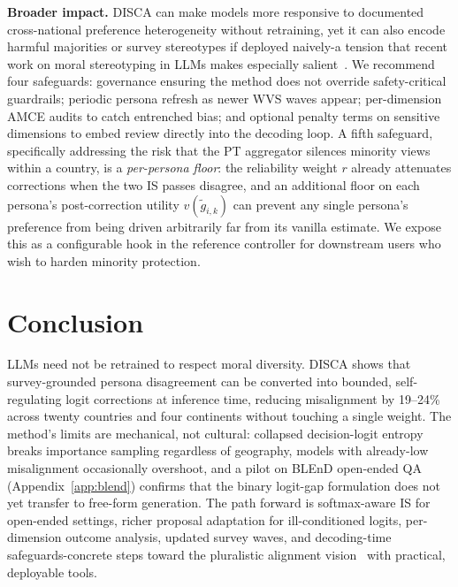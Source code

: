 \documentclass{article}
\begin{document}
\textbf{Broader impact.}
DISCA can make models more responsive to documented cross-national
preference heterogeneity without retraining, yet it can also encode
harmful majorities or survey stereotypes if deployed naively-a tension
that recent work on moral stereotyping in LLMs makes especially
salient~\citep{zewail2025moral}. We recommend four safeguards:
governance ensuring the method does not override safety-critical
guardrails; periodic persona refresh as newer WVS waves appear;
per-dimension AMCE audits to catch entrenched bias; and optional penalty
terms on sensitive dimensions to embed review directly into the decoding
loop. A fifth safeguard, specifically addressing the risk that the PT
aggregator silences minority views within a country, is a
\emph{per-persona floor}: the reliability weight $r$ already attenuates
corrections when the two IS passes disagree, and an additional floor on
each persona's post-correction utility $v(\tilde g_{i,k})$ can prevent
any single persona's preference from being driven arbitrarily far from
its vanilla estimate. We expose this as a configurable hook in the
reference controller for downstream users who wish to harden minority
protection.

\section{Conclusion}
\label{sec:conclusion}

LLMs need not be retrained to respect moral diversity. DISCA shows that survey-grounded persona disagreement can be converted into bounded, self-regulating logit corrections at inference time, reducing misalignment by 19--24\% across twenty countries and four continents without touching a single weight. The method's limits are mechanical, not cultural: collapsed decision-logit entropy breaks importance sampling regardless of geography, models with already-low misalignment occasionally overshoot, and a pilot on BLEnD open-ended QA (Appendix~\ref{app:blend}) confirms that the binary logit-gap formulation does not yet transfer to free-form generation. The path forward is softmax-aware IS for open-ended settings, richer proposal adaptation for ill-conditioned logits, per-dimension outcome analysis, updated survey waves, and decoding-time safeguards-concrete steps toward the pluralistic alignment vision~\citep{sorensen2024roadmap} with practical, deployable tools.
\end{document}
